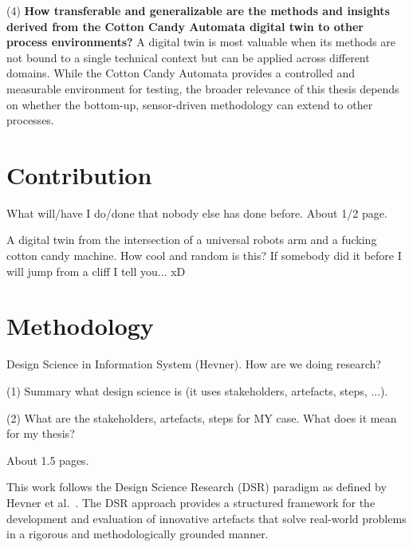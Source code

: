 (4) \textbf{How transferable and generalizable are the methods and insights derived from the Cotton Candy Automata digital twin to other process environments?}
A digital twin is most valuable when its methods are not bound to a single technical context but can be applied across different domains. While the Cotton Candy Automata provides a controlled and measurable environment for testing, the broader relevance of this thesis depends on whether the bottom-up, sensor-driven methodology can extend to other processes.

\section{Contribution}
\label{sec:intro:con}

What will/have I do/done that nobody else has done before. About 1/2 page.

A digital twin from the intersection of a universal robots arm and a fucking cotton candy machine. How cool and random is this?
If somebody did it before I will jump from a cliff I tell you... xD

\section{Methodology}
\label{sec:intro:meth}



Design Science in Information System (Hevner). How are we doing research?

(1) Summary what design science is (it uses stakeholders, artefacts, steps,
...). 

(2) What are the stakeholders, artefacts, steps for MY case.
What does it mean for my thesis?

About 1.5 pages.


This work follows the Design Science Research (DSR) paradigm as defined by Hevner et al.~\cite{Hevner2004}. The DSR approach provides a structured framework for the development and evaluation of innovative artefacts that solve real-world problems in a rigorous and methodologically grounded manner.

